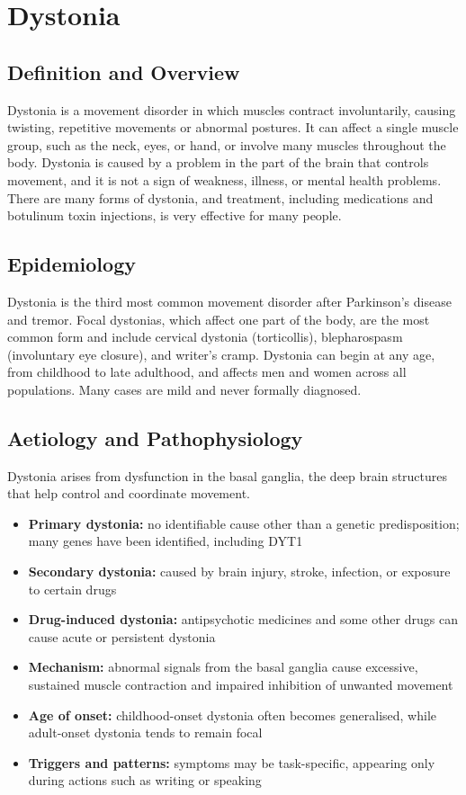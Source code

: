 \chapter{Dystonia}

\section*{Definition and Overview}
Dystonia is a movement disorder in which muscles contract involuntarily, causing twisting, repetitive movements or abnormal postures. It can affect a single muscle group, such as the neck, eyes, or hand, or involve many muscles throughout the body. Dystonia is caused by a problem in the part of the brain that controls movement, and it is not a sign of weakness, illness, or mental health problems. There are many forms of dystonia, and treatment, including medications and botulinum toxin injections, is very effective for many people.

\section*{Epidemiology}
Dystonia is the third most common movement disorder after Parkinson's disease and tremor. Focal dystonias, which affect one part of the body, are the most common form and include cervical dystonia (torticollis), blepharospasm (involuntary eye closure), and writer's cramp. Dystonia can begin at any age, from childhood to late adulthood, and affects men and women across all populations. Many cases are mild and never formally diagnosed.

\section*{Aetiology and Pathophysiology}
Dystonia arises from dysfunction in the basal ganglia, the deep brain structures that help control and coordinate movement.
\begin{itemize}
    \item \textbf{Primary dystonia:} no identifiable cause other than a genetic predisposition; many genes have been identified, including DYT1
    \item \textbf{Secondary dystonia:} caused by brain injury, stroke, infection, or exposure to certain drugs
    \item \textbf{Drug-induced dystonia:} antipsychotic medicines and some other drugs can cause acute or persistent dystonia
    \item \textbf{Mechanism:} abnormal signals from the basal ganglia cause excessive, sustained muscle contraction and impaired inhibition of unwanted movement
    \item \textbf{Age of onset:} childhood-onset dystonia often becomes generalised, while adult-onset dystonia tends to remain focal
    \item \textbf{Triggers and patterns:} symptoms may be task-specific, appearing only during actions such as writing or speaking
\end{itemize}

